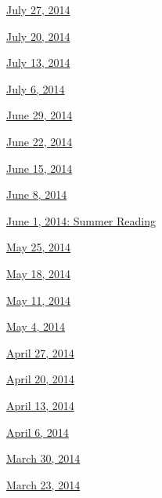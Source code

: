 \href{http://www.nytimes3xbfgragh.onion/indexes/2014/07/27/books/review/index.html}{July
27, 2014}

\href{http://www.nytimes3xbfgragh.onion/indexes/2014/07/20/books/review/index.html}{July
20, 2014}

\href{http://www.nytimes3xbfgragh.onion/indexes/2014/07/13/books/review/index.html}{July
13, 2014}

\href{http://www.nytimes3xbfgragh.onion/indexes/2014/07/06/books/review/index.html}{July
6, 2014}

\href{http://www.nytimes3xbfgragh.onion/indexes/2014/06/29/books/review/index.html}{June
29, 2014}

\href{http://www.nytimes3xbfgragh.onion/indexes/2014/06/22/books/review/index.html}{June
22, 2014}

\href{http://www.nytimes3xbfgragh.onion/indexes/2014/06/15/books/review/index.html}{June
15, 2014}

\href{http://www.nytimes3xbfgragh.onion/indexes/2014/06/08/books/review/index.html}{June
8, 2014}

\href{http://www.nytimes3xbfgragh.onion/indexes/2014/06/01/books/review/index.html}{June
1, 2014: Summer Reading}

\href{http://www.nytimes3xbfgragh.onion/indexes/2014/05/25/books/review/index.html}{May
25, 2014}

\href{http://www.nytimes3xbfgragh.onion/indexes/2014/05/18/books/review/index.html}{May
18, 2014}

\href{http://www.nytimes3xbfgragh.onion/indexes/2014/05/11/books/review/index.html}{May
11, 2014}

\href{http://www.nytimes3xbfgragh.onion/indexes/2014/05/04/books/review/index.html}{May
4, 2014}

\href{http://www.nytimes3xbfgragh.onion/indexes/2014/04/27/books/review/index.html}{April
27, 2014}

\href{http://www.nytimes3xbfgragh.onion/indexes/2014/04/20/books/review/index.html}{April
20, 2014}

\href{http://www.nytimes3xbfgragh.onion/indexes/2014/04/13/books/review/index.html}{April
13, 2014}

\href{http://www.nytimes3xbfgragh.onion/indexes/2014/04/06/books/review/index.html}{April
6, 2014}

\href{http://www.nytimes3xbfgragh.onion/indexes/2014/03/30/books/review/index.html}{March
30, 2014}

\href{http://www.nytimes3xbfgragh.onion/indexes/2014/03/23/books/review/index.html}{March
23, 2014}

